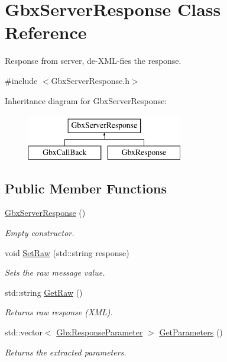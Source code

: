 \hypertarget{classGbxServerResponse}{\section{Gbx\-Server\-Response Class Reference}
\label{classGbxServerResponse}
}


Response from server, de-\/\-X\-M\-L-\/fies the response.  




{\ttfamily \#include $<$Gbx\-Server\-Response.\-h$>$}

Inheritance diagram for Gbx\-Server\-Response\-:\begin{figure}[H]
\begin{center}
\leavevmode
\includegraphics[height=2.000000cm]{classGbxServerResponse}
\end{center}
\end{figure}
\subsection*{Public Member Functions}
\begin{DoxyCompactItemize}
\item 
\hyperlink{classGbxServerResponse_a2198b6f6ca6b7da1ffd7bfa9a516d8b2}{Gbx\-Server\-Response} ()
\begin{DoxyCompactList}\small\item\em Empty constructor. \end{DoxyCompactList}\item 
void \hyperlink{classGbxServerResponse_a178871bec787d490f69def87f0242e05}{Set\-Raw} (std\-::string response)
\begin{DoxyCompactList}\small\item\em Sets the raw message value. \end{DoxyCompactList}\item 
std\-::string \hyperlink{classGbxServerResponse_aa449d9a63899e1d1205e6ab916798ba6}{Get\-Raw} ()
\begin{DoxyCompactList}\small\item\em Returns raw response (X\-M\-L). \end{DoxyCompactList}\item 
std\-::vector$<$ \hyperlink{classGbxResponseParameter}{Gbx\-Response\-Parameter} $>$ \hyperlink{classGbxServerResponse_a6d42bdaaeff3368e1fab2984940d2a2c}{Get\-Parameters} ()
\begin{DoxyCompactList}\small\item\em Returns the extracted parameters. \end{DoxyCompactList}\end{DoxyCompactItemize}
